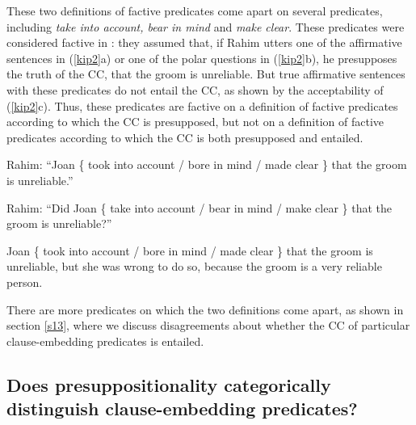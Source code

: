 \documentclass[11pt,fleqn]{article}
\newcommand{\6}{\mbox{$[\hspace*{-.6mm}[$}}
\newcommand{\9}{\mbox{$]\hspace*{-.6mm}]$}}
\begin{document}
These two definitions of factive predicates come apart on several predicates, including {\em take into account, bear in mind} and {\em make clear}. These predicates were considered factive in \citealt{kiparsky-kiparsky70}: they assumed that, if Rahim utters one of the affirmative sentences in (\ref{kip2}a) or one of the polar questions in (\ref{kip2}b), he presupposes the truth of the CC, that the groom is unreliable. But true affirmative sentences with these predicates do not entail the CC, as shown by the acceptability of (\ref{kip2}c). Thus, these predicates are factive on a definition of factive predicates according to which the CC is presupposed, but not on a definition of factive predicates according to which the CC is both presupposed and entailed.

\begin{exe}
\ex\label{kip2}
\begin{xlist}
\ex Rahim: ``Joan  \{ took into account / bore in mind / made clear \}  that the groom is unreliable.''

\ex Rahim: ``Did Joan \{ take into account / bear in mind / make clear \} that the groom is unreliable?''

\ex Joan  \{ took into account / bore in mind / made clear \} that the groom is unreliable, but she was wrong to do so, because the groom is a very reliable person.
\end{xlist}
\end{exe}
There are more predicates on which the two definitions come apart, as shown in section \ref{s13}, where we discuss disagreements about whether the CC of particular clause-embedding predicates is entailed.

\subsection{Does presuppositionality categorically distinguish clause-embedding predicates?}\label{s12}
\end{document}
